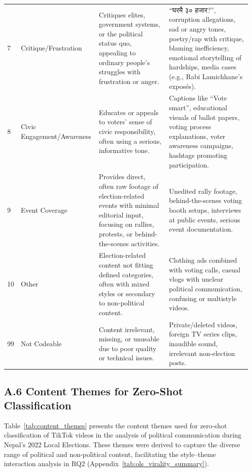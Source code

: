 \documentclass[12pt,a4paper]{report}
\begin{document}
\begin{landscape}
\begin{longtable}{@{} p{1.0cm} p{5.0cm} p{6.0cm} p{8.0cm} @{}}
7 & Critique/Frustration & Critiques elites, government systems, or the political status quo, appealing to ordinary people’s struggles with frustration or anger. & ``\texthindi{घरमै ३० हजार?}'', corruption allegations, sad or angry tones, poetry/rap with critique, blaming inefficiency, emotional storytelling of hardships, media cases (e.g., Rabi Lamichhane’s exposés). \\
8 & Civic Engagement/Awareness & Educates or appeals to voters’ sense of civic responsibility, often using a serious, informative tone. & Captions like ``Vote smart'', educational visuals of ballot papers, voting process explanations, voter awareness campaigns, hashtags promoting participation. \\
9 & Event Coverage & Provides direct, often raw footage of election-related events with minimal editorial input, focusing on rallies, protests, or behind-the-scenes activities. & Unedited rally footage, behind-the-scenes voting booth setups, interviews at public events, serious event documentation. \\
10 & Other & Election-related content not fitting defined categories, often with mixed styles or secondary to non-political content. & Clothing ads combined with voting calls, casual vlogs with unclear political communication, confusing or multistyle videos. \\
99 & Not Codeable & Content irrelevant, missing, or unusable due to poor quality or technical issues. & Private/deleted videos, foreign TV series clips, inaudible sound, irrelevant non-election posts. \\
\bottomrule
\end{longtable}
\end{landscape}

\subsection*{A.6 Content Themes for Zero-Shot Classification}
\textbf{}
\label{app:content_themes}

Table~\ref{tab:content_themes} presents the content themes used for zero-shot classification of TikTok videos in the analysis of political communication during Nepal’s 2022 Local Elections. These themes were derived to capture the diverse range of political and non-political content, facilitating the style--theme interaction analysis in RQ2 (Appendix~\ref{tab:ols_virality_summary}).
\end{document}
